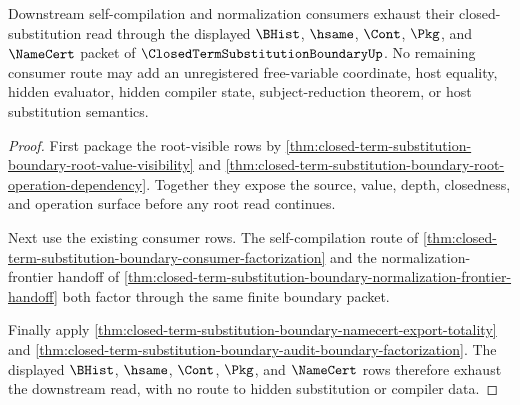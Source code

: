 \begin{theorem}
\label{thm:closed-term-substitution-boundary-root-consumer-exhaustion}
Downstream self-compilation and normalization consumers exhaust their closed-substitution read through the displayed $\BHist$, $\hsame$, $\Cont$, $\Pkg$, and $\NameCert$ packet of $\ClosedTermSubstitutionBoundaryUp$. No remaining consumer route may add an unregistered free-variable coordinate, host equality, hidden evaluator, hidden compiler state, subject-reduction theorem, or host substitution semantics.
\end{theorem}
\begin{proof}
First package the root-visible rows by \autoref{thm:closed-term-substitution-boundary-root-value-visibility} and \autoref{thm:closed-term-substitution-boundary-root-operation-dependency}. Together they expose the source, value, depth, closedness, and operation surface before any root read continues.

Next use the existing consumer rows. The self-compilation route of \autoref{thm:closed-term-substitution-boundary-consumer-factorization} and the normalization-frontier handoff of \autoref{thm:closed-term-substitution-boundary-normalization-frontier-handoff} both factor through the same finite boundary packet.

Finally apply \autoref{thm:closed-term-substitution-boundary-namecert-export-totality} and \autoref{thm:closed-term-substitution-boundary-audit-boundary-factorization}. The displayed $\BHist$, $\hsame$, $\Cont$, $\Pkg$, and $\NameCert$ rows therefore exhaust the downstream read, with no route to hidden substitution or compiler data.
\end{proof}


